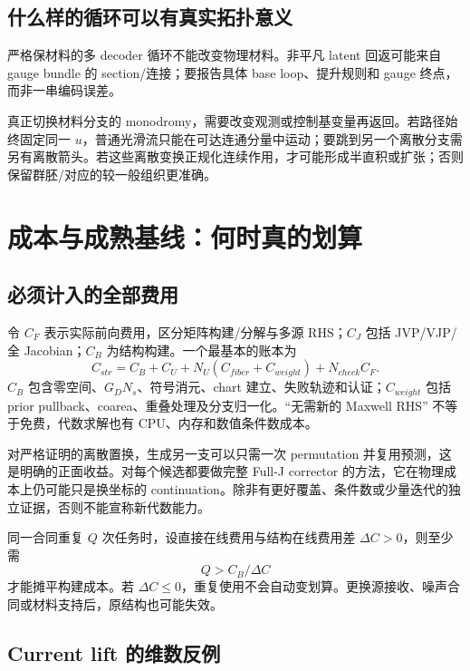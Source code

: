 \subsection{什么样的循环可以有真实拓扑意义}

严格保材料的多 decoder 循环不能改变物理材料。非平凡 latent 回返可能来自 gauge bundle 的 section/连接；要报告具体 base loop、提升规则和 gauge 终点，而非一串编码误差。

真正切换材料分支的 monodromy，需要改变观测或控制基变量再返回。若路径始终固定同一 $u$，普通光滑流只能在可达连通分量中运动；要跳到另一个离散分支需另有离散箭头。若这些离散变换正规化连续作用，才可能形成半直积或扩张；否则保留群胚/对应的较一般组织更准确。

\section{成本与成熟基线：何时真的划算}

\subsection{必须计入的全部费用}

令 $C_F$ 表示实际前向费用，区分矩阵构建/分解与多源 RHS；$C_J$ 包括 JVP/VJP/全 Jacobian；$C_B$ 为结构构建。一个最基本的账本为
\begin{equation}
C_{str}=C_B+C_U+N_U(C_{fiber}+C_{weight})+N_{check}C_F.
\end{equation}
$C_B$ 包含零空间、$G_DN_s$、符号消元、chart 建立、失败轨迹和认证；$C_{weight}$ 包括 prior pullback、coarea、重叠处理及分支归一化。``无需新的 Maxwell RHS'' 不等于免费，代数求解也有 CPU、内存和数值条件数成本。

对严格证明的离散置换，生成另一支可以只需一次 permutation 并复用预测，这是明确的正面收益。对每个候选都要做完整 Full-J corrector 的方法，它在物理成本上仍可能只是换坐标的 continuation。除非有更好覆盖、条件数或少量迭代的独立证据，否则不能宣称新代数能力。

同一合同重复 $Q$ 次任务时，设直接在线费用与结构在线费用差 $\Delta C>0$，则至少需
\begin{equation}
Q>C_B/\Delta C
\end{equation}
才能摊平构建成本。若 $\Delta C\le0$，重复使用不会自动变划算。更换源接收、噪声合同或材料支持后，原结构也可能失效。

\subsection{Current lift 的维数反例}

